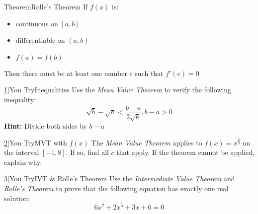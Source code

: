 \documentclass{MathNotes}
\newenvironment{theorem}[1]{\begin{GrayBox}{Theorem}{#1}}{\end{GrayBox}}
\newenvironment{practice}[2]{\begin{PurpleBox}{\texorpdfstring{#1}\Big|You Try}{#2}}{\end{PurpleBox}}
\begin{document}
\begin{multicols}{2}
	\begin{center}
	\end{center}
	\begin{theorem}{Rolle's Theorem}
		If $f(x)$ is:
		\begin{itemize}
			\item continuous on $[a, b]$
			\item differentiable on $(a, b)$
			\item $f(a)=f(b)$
		\end{itemize}
		Then there must be at least one number $c$ such that $f'(c)=0$
	\end{theorem}
\end{multicols}
\begin{multicols}{2}
	\begin{practice}{\hyperref[ans:3.2-1]{1}}{Inequalities}\label{prac:3.2-1}
		Use the \textit{Mean Value Theorem} to verify the following inequality:
		$$\sqrt{b}-\sqrt{a}<\frac{b-a}{2\sqrt{b}},b-a>0$$
		\textbf{Hint:} Divide both sides by $b-a$
	\end{practice}
	\begin{practice}{\hyperref[ans:3.2-2]{2}}{MVT with $f(x)$}\label{prac:3.2-2}
		The \textit{Mean Value Theorem} applies to $f(x)=x^{\frac{2}{3}}$ on the
		interval $[-1, 8]$. If so, find all $c$ that apply. If the theorem cannot
		be applied, explain why.
	\end{practice}
\end{multicols}
\begin{practice}{\hyperref[ans:3.2-3]{3}}{IVT \& Rolle's Theorem}\label{prac:3.2-3}
	Use the \textit{Intermediate Value Theorem} and \textit{Rolle's Theorem} to
	prove that the following equation has exactly one real solution:
	$$6x^7+2x^5+3x+6=0$$
\end{practice}
\end{document}
